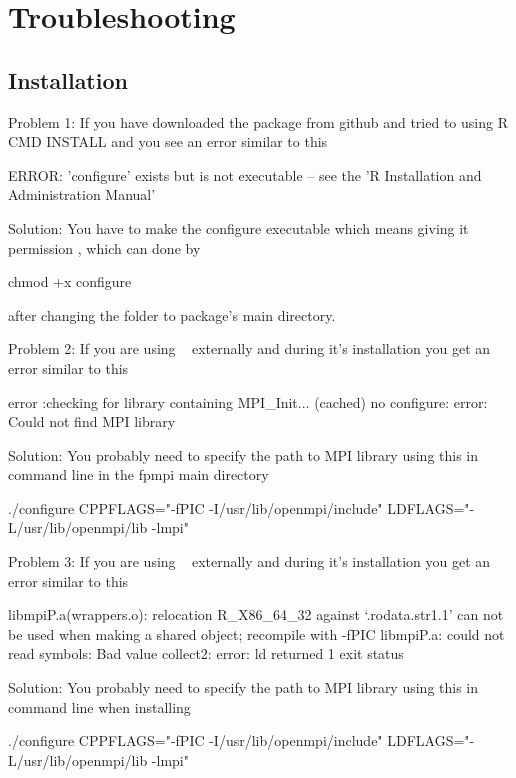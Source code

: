 \section{ Troubleshooting}
\label{sec:debug}


\subsection{Installation}

{\color{red}Problem 1:}  If you have downloaded the package from github and 
tried to using R CMD INSTALL  and you see an error similar to this
\begin{Output}
ERROR: 'configure' exists but is not executable -- see the 'R Installation and Administration Manual'
\end{Output}
{\color{dkgreen}Solution:}  You have to make the configure executable which 
means giving it permission , which can done by
\begin{Code}
chmod +x configure
\end{Code}
after changing the folder to package's main directory.

{\color{red}Problem 2:}  If you are using ~\citep{fpmpi} externally 
and during it's installation you get an error similar to this
\begin{Output}
error :checking for library containing MPI_Init... (cached) no configure: 
error: Could not find MPI library
\end{Output}
{\color{dkgreen}Solution:} You probably need to specify the path to MPI library using this in command line in the fpmpi main directory
\begin{Code}
./configure CPPFLAGS="-fPIC -I/usr/lib/openmpi/include" LDFLAGS="-L/usr/lib/openmpi/lib -lmpi"
\end{Code}

{\color{red}Problem 3:}  If you are using ~\citep{mpiP} externally
and during it's installation you get an error similar to this
\begin{Output}
libmpiP.a(wrappers.o): relocation R_X86_64_32 against `.rodata.str1.1' can not be used when making a shared object; recompile with -fPIC
libmpiP.a: could not read symbols: Bad value collect2: error: ld returned 1 exit status
\end{Output}
{\color{dkgreen}Solution:} You probably need to specify the path to MPI library
using this in command line when installing 
\begin{Code}
./configure CPPFLAGS="-fPIC -I/usr/lib/openmpi/include" LDFLAGS="-L/usr/lib/openmpi/lib -lmpi"
\end{Code}

